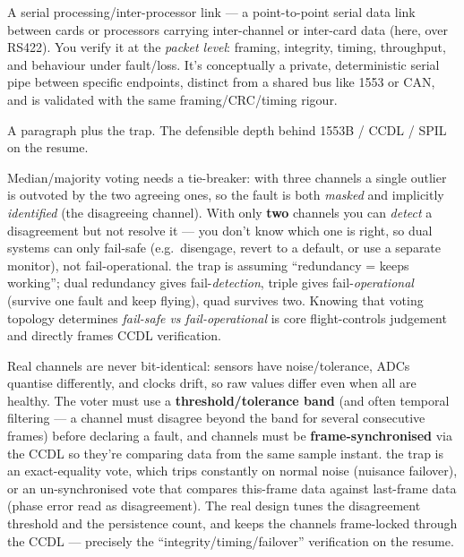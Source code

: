 A serial processing/inter-processor link --- a point-to-point serial data link
between cards or processors carrying inter-channel or inter-card data (here, over
RS422). You verify it at the \emph{packet level}: framing, integrity, timing,
throughput, and behaviour under fault/loss. It's conceptually a private,
deterministic serial pipe between specific endpoints, distinct from a shared bus
like 1553 or CAN, and is validated with the same framing/CRC/timing rigour.

%
{A paragraph plus the trap. The defensible depth behind 1553B / CCDL / SPIL on
the resume.}

Median/majority voting needs a tie-breaker: with three channels a single
outlier is outvoted by the two agreeing ones, so the fault is both \emph{masked}
and implicitly \emph{identified} (the disagreeing channel). With only \textbf{two}
channels you can \emph{detect} a disagreement but not resolve it --- you don't
know which one is right, so dual systems can only fail-safe (e.g.\ disengage,
revert to a default, or use a separate monitor), not fail-operational. \trap the
trap is assuming ``redundancy = keeps working''; dual redundancy gives
fail-\emph{detection}, triple gives fail-\emph{operational} (survive one fault
and keep flying), quad survives two. Knowing that voting topology determines
\emph{fail-safe vs fail-operational} is core flight-controls judgement and
directly frames CCDL verification.

Real channels are never bit-identical: sensors have noise/tolerance, ADCs
quantise differently, and clocks drift, so raw values differ even when all are
healthy. The voter must use a \textbf{threshold/tolerance band} (and often
temporal filtering --- a channel must disagree beyond the band for several
consecutive frames) before declaring a fault, and channels must be
\textbf{frame-synchronised} via the CCDL so they're comparing data from the same
sample instant. \trap the trap is an exact-equality vote, which trips constantly
on normal noise (nuisance failover), or an un-synchronised vote that compares
this-frame data against last-frame data (phase error read as disagreement). The
real design tunes the disagreement threshold and the persistence count, and
keeps the channels frame-locked through the CCDL --- precisely the
``integrity/timing/failover'' verification on the resume.


